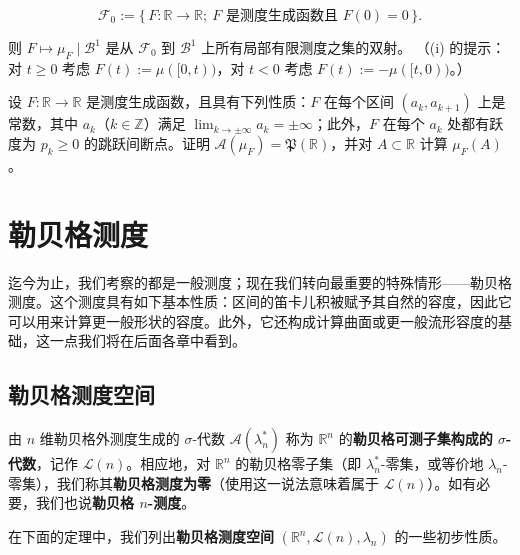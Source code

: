 \begin{exercises}
\begin{subitems}
\[
\mathcal{F}_{0} := \{\, F\colon \mathbb{R} \to \mathbb{R} ;\ F \text{ 是测度生成函数且 } F(0) = 0 \,\} .
\]

则 $ F \mapsto \mu_{F} \mid \mathcal{B}^{1} $ 是从 $ \mathcal{F}_{0} $ 到 $ \mathcal{B}^{1} $ 上所有局部有限测度之集的双射。
（(i) 的提示：对 $ t \ge 0 $ 考虑 $ F(t) := \mu([0, t)) $，对 $ t < 0 $ 考虑 $ F(t) := -\mu([t, 0)) $。）

\end{subitems}

\item

设 $ F\colon \mathbb{R} \to \mathbb{R} $ 是测度生成函数，且具有下列性质：$ F $ 在每个区间 $ (a_{k}, a_{k+1}) $ 上是常数，其中 $ a_{k} $（$ k \in \mathbb{Z} $）满足 $ \lim_{k \to \pm\infty} a_{k} = \pm\infty $；此外，$ F $ 在每个 $ a_{k} $ 处都有跃度为 $ p_{k} \ge 0 $ 的跳跃间断点。证明 $ \mathcal{A}(\mu_{F}) = \mathfrak{P}(\mathbb{R}) $，并对 $ A \subset \mathbb{R} $ 计算 $ \mu_{F}(A) $。

\end{exercises}

\section{勒贝格测度}

迄今为止，我们考察的都是一般测度；现在我们转向最重要的特殊情形——勒贝格测度。这个测度具有如下基本性质：区间的笛卡儿积被赋予其自然的容度，因此它可以用来计算更一般形状的容度。此外，它还构成计算曲面或更一般流形容度的基础，这一点我们将在后面各章中看到。

\subsection*{勒贝格测度空间}

由 $ n $ 维勒贝格外测度生成的 $ \sigma $-代数 $ \mathcal{A}(\lambda_n^{*}) $ 称为 $ \mathbb{R}^n $ 的\textbf{勒贝格可测子集构成的 $ \sigma $-代数}，记作 $ \mathcal{L}(n) $。相应地，对 $ \mathbb{R}^n $ 的勒贝格零子集（即 $ \lambda_n^{*} $-零集，或等价地 $ \lambda_n $-零集），我们称其\textbf{勒贝格测度为零}（使用这一说法意味着属于 $ \mathcal{L}(n) $）。如有必要，我们也说\textbf{勒贝格 $ n $-测度}。

在下面的定理中，我们列出\textbf{勒贝格测度空间} $ (\mathbb{R}^n, \mathcal{L}(n), \lambda_n) $ 的一些初步性质。

